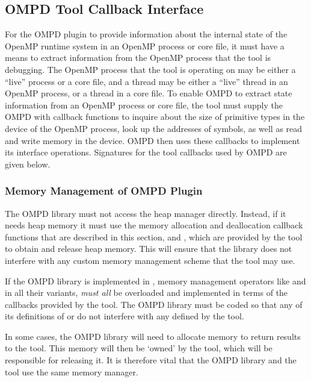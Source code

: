 \subsection{OMPD Tool Callback Interface}
\label{subsec:ompd-tool-callback-interface}

For the OMPD plugin to provide information about the internal state
of the OpenMP runtime system in an OpenMP process or core file,
it must have a means to extract information from
the OpenMP process that the tool is debugging.
The OpenMP process that the tool is operating on may be either a ``live'' process or a core file,
and a thread may be either a ``live'' thread in an OpenMP process,
or a thread in a core file.
To enable OMPD to extract state information from an OpenMP process or core file,
the tool must supply the OMPD with callback functions to inquire
about the size of primitive types in the device of the OpenMP process,
look up the addresses of symbols,
as well as read and write memory in the device.
OMPD then uses these callbacks to implement its interface operations.
Signatures for the tool callbacks used by OMPD are given below.

\subsubsection{Memory Management of OMPD Plugin}
The OMPD library must not access the heap manager directly. Instead, if it needs heap memory it
must use the memory allocation and deallocation callback functions that are described in this
section,  and ,  which are
provided by the tool to obtain and release heap memory. This will ensure that the library does not
interfere with any custom memory management scheme that the tool may use.

If the OMPD library is implemented in , memory management operators like 
and  in all their variants, \emph{must all} be overloaded and implemented in terms of
the callbacks provided by the tool. The OMPD library must be coded so that any of its
definitions of  or  do not interfere with any defined by the tool.

In some cases, the OMPD library will need to allocate memory to return results to the
tool. This memory will then be `owned' by the tool, which will be responsible for releasing it. It is
therefore vital that the OMPD library and the tool use the same memory manager.

